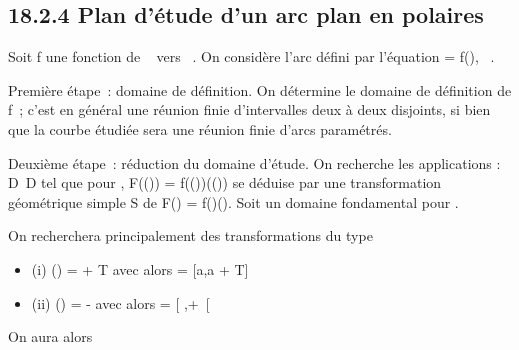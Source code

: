 \documentclass[]{article}
\begin{document}
\subsection{18.2.4 Plan d'étude d'un arc plan en polaires}

Soit f une fonction de ~ vers ~. On considère l'arc défini par
l'équation \rho = f(\theta), \theta \in {}~.

Première étape~: domaine de définition. On détermine le domaine de
définition de f~; c'est en général une réunion finie d'intervalles deux
à deux disjoints, si bien que la courbe étudiée sera une réunion finie
d'arcs paramétrés.

Deuxième étape~: réduction du domaine d'étude. On recherche les
applications \sigma : D\rightarrow~D tel que pour \theta \inD, F(\sigma(\theta)) =
f(\sigma(\theta))\vecu(\sigma(\theta)) se déduise par une transformation
géométrique simple S de F(\theta) = f(\theta)\vecu(\theta). Soit \Delta
un domaine fondamental pour \sigma.

On recherchera principalement des transformations \theta du type

\begin{itemize}
\itemsep1pt\parskip0pt
\item
  (i) \sigma(\theta) = \theta + T avec alors \Delta = [a,a + T] \bigcapD
\item
  (ii) \sigma(\theta) = \omega - \theta avec alors \Delta = [ \omega {}
  ,+\infty~[\bigcapD
\end{itemize}

On aura alors
\end{document}
